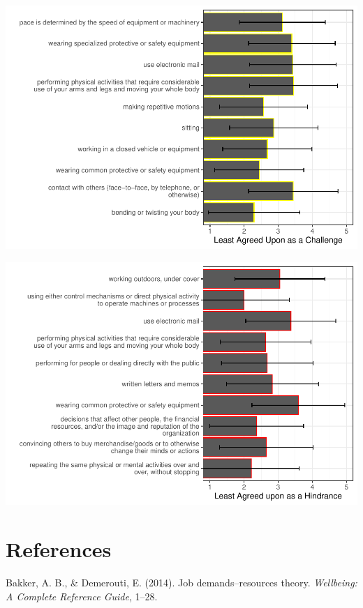 \documentclass[
  english,
  man]{apa6}
\begin{document}
\includegraphics{JDR_3_Crosswalk_files/figure-latex/challengeshighsd-1.pdf}

\includegraphics{JDR_3_Crosswalk_files/figure-latex/hindranceshighsd-1.pdf}

\newpage

\hypertarget{references}{%
\section{References}\label{references}}

\begingroup
\setlength{\parindent}{-0.5in}
\setlength{\leftskip}{0.5in}

\hypertarget{refs}{}
\leavevmode\hypertarget{ref-bakker2014job}{}%
Bakker, A. B., \& Demerouti, E. (2014). Job demands--resources theory. \emph{Wellbeing: A Complete Reference Guide}, 1--28.
\end{document}
